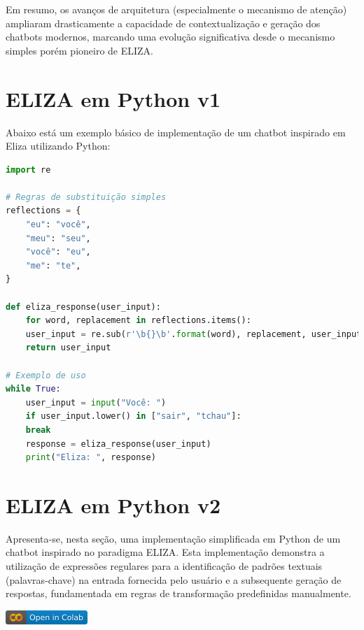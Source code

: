 \documentclass[14pt,a4paper,oneside]{book}
\begin{document}
Em resumo, os avanços de arquitetura (especialmente o mecanismo de atenção) ampliaram drasticamente a capacidade de contextualização e geração dos chatbots modernos, marcando uma evolução significativa desde o mecanismo simples porém pioneiro de ELIZA.

\section{ELIZA em Python v1}

Abaixo está um exemplo básico de implementação de um chatbot inspirado em Eliza utilizando Python:

\begin{lstlisting}[language=Python, caption=Exemplo simples do Eliza,label=lst:eliza_chatbot]
import re

# Regras de substituição simples
reflections = {
	"eu": "você",
	"meu": "seu",
	"você": "eu",
	"me": "te",
}

def eliza_response(user_input):
	for word, replacement in reflections.items():
	user_input = re.sub(r'\b{}\b'.format(word), replacement, user_input)
	return user_input

# Exemplo de uso
while True:
	user_input = input("Você: ")
	if user_input.lower() in ["sair", "tchau"]:
	break
	response = eliza_response(user_input)
	print("Eliza: ", response)
\end{lstlisting}

\section{ELIZA em Python v2}

Apresenta-se, nesta seção, uma implementação simplificada em Python de um chatbot inspirado no paradigma ELIZA. 
Esta implementação demonstra a utilização de expressões regulares para a identificação de padrões textuais (palavras-chave) na entrada fornecida pelo usuário e a subsequente geração de respostas, fundamentada em regras de transformação predefinidas manualmente.

\vspace{\baselineskip}
\href{https://colab.research.google.com/github/giseldo/chatbotbook/blob/main/notebook/eliza.ipynb}{
  \includegraphics{./fig/colab-badge.png}
}
\end{document}
